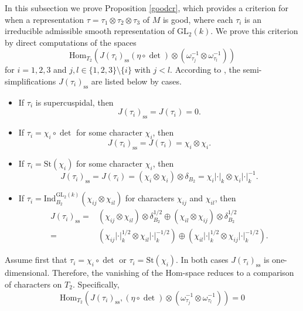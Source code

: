 \documentclass[12pt]{amsart}
\newcommand{\GL}{{\mathrm{GL}}}
\newcommand{\Hom}{{\mathrm{Hom}}}
\newcommand{\Ind}{{\mathrm{Ind}}}
\newcommand{\absk}[1]{\left\lvert#1\right\rvert_k}
\theoremstyle{Theorem}
\theoremstyle{Theorem}
\theoremstyle{Theorem}
\theoremstyle{Theorem}
\theoremstyle{Plain}
\theoremstyle{remark}
\theoremstyle{remark}
\theoremstyle{Definition}
\begin{document}
In this subsection we prove Proposition \ref{goodcr}, which provides a criterion for when a representation $ \tau = \tau_1 \otimes \tau_2 \otimes \tau_3 $ of $M$ is good, where each $\tau_i$ is an irreducible admissible smooth representation of $\GL_2(k)$. We prove this criterion by direct computations of the spaces
\[
    \Hom_{T_2}
    \left(
        J( \tau_i )_\mathrm{ss} ( \eta \circ \det ) \otimes \left( \omega_{ \tau_j }^{-1} \otimes \omega_{ \tau_l }^{-1} \right)
    \right)
\]
for $ i = 1, 2, 3 $ and $ j, l \in \{ 1, 2, 3 \} \setminus \{ i \} $ with $ j < l $. According to \cite[Restriction-Induction Lemma (in section 9)]{B-H}, the semi-simplifications $ J( \tau_i )_\mathrm{ss} $ are listed below by cases.                     
\begin{itemize}
    \item If $\tau_i$ is supercuspidal, then 
    \[
        J( \tau_{i} )_\mathrm{ss} = J( \tau_i ) = 0.
    \]
    \item If $ \tau_i = \chi_i \circ \det $ for some character $\chi_i$, then 
    \[
        J( \tau_{i} )_\mathrm{ss} = J( \tau_i ) = \chi_i \otimes \chi_i.
    \]
    \item If $ \tau_i = \mathrm{St} ( \chi_i ) $ for some character $\chi_i$, then 
    \[
        J( \tau_{i} )_\mathrm{ss} = J( \tau_i ) =( \chi_i \otimes \chi_i ) \otimes \delta_{B_2} = \chi_i \absk{ \cdot } \otimes \chi_i \absk{ \cdot }^{-1}.
    \]
    \item If $ \tau_i = \Ind^{ \GL_2(k) }_{B_2} ( \chi_{ij} \otimes \chi_{il} ) $ for characters $\chi_{ij}$ and $\chi_{il}$, then 
    \[
        \begin{aligned}
            J( \tau_{i} )_\mathrm{ss} =& ( \chi_{ij} \otimes \chi_{il} ) \otimes \delta_{B_2}^{1/2} \oplus ( \chi_{il} \otimes \chi_{ij} ) \otimes \delta_{B_2}^{1/2}\\
                                      =& \left( \chi_{ij} \absk{ \cdot }^{1/2} \otimes \chi_{il} \absk{ \cdot }^{-1/2} \right) \oplus \left( \chi_{il} \absk{ \cdot }^{1/2} \otimes \chi_{ij} \absk{ \cdot }^{-1/2} \right).
        \end{aligned}
    \]
\end{itemize}
Assume first that $ \tau_i = \chi_i \circ \det $ or $ \tau_i = \mathrm{St} ( \chi_i ) $. In both cases $ J( \tau_i )_\mathrm{ss} $ is one-dimensional. Therefore, the vanishing of the Hom-space reduces to a comparison of characters on $T_2$. Specifically,  
\[
    \Hom_{T_2}
    \left(
        J( \tau_i )_\mathrm{ss},( \eta \circ \det ) \otimes \left( \omega_{ \tau_j }^{-1} \otimes \omega_{ \tau_l }^{-1} \right)
    \right)
    = 0
\]
\end{document}
